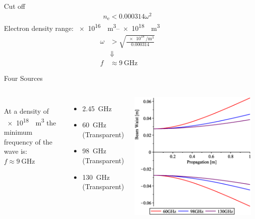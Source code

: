 \documentclass[hyperref={colorlinks=true,urlcolor=blue,linkcolor=.},aspectratio=1610,mathserif]{beamer}
\begin{document}
\begin{frame}{Cut off}
	\centering
	\begin{align}
		n_\mathrm{e} < 0.000314\omega^2
	\end{align}
	Electron density range: \SIrange{e16}{e18}{\per\meter\cubed}
	\begin{align}
		\omega & > \sqrt{\frac{\SI{e18}{\per\meter\cubed}}{0.000314}} \\
		       & \Downarrow\nonumber                                  \\
		f      & \approx \SI{9}{\giga\hertz}
	\end{align}
\end{frame}
\begin{frame}{Four Sources}
	\begin{columns}
		\\
		At a density of \SI{e18}{\per\meter\cubed} the minimum frequency of the wave is:
		\(f \approx \SI{9}{\giga\hertz}\)\newline
		\begin{itemize}
			\item \SI{2.45}{\giga\hertz}
			\item \SI{60}{\giga\hertz} (Transparent)
			\item \SI{98}{\giga\hertz} (Transparent)
			\item \SI{130}{\giga\hertz} (Transparent)
		\end{itemize}
		\includegraphics[width=\textwidth]{Figures/BeamProp.eps}
	\end{columns}
\end{frame}
\end{document}

